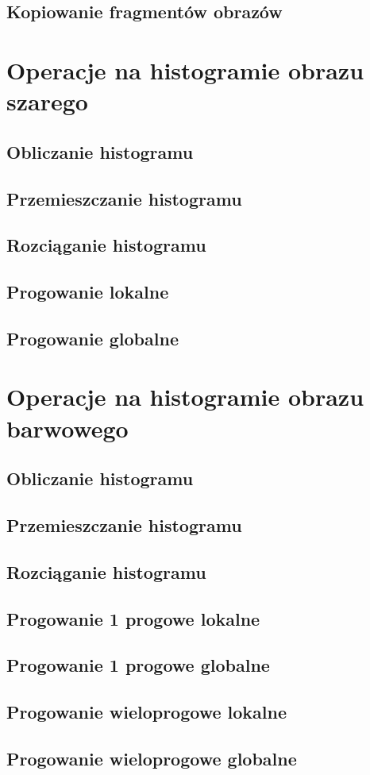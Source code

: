\documentclass[a4paper,12pt, titlepage]{report}
\begin{document}
\section{Kopiowanie fragmentów obrazów}

\chapter{Operacje na histogramie obrazu szarego}
\section{Obliczanie histogramu}
\section{Przemieszczanie histogramu}
\section{Rozciąganie histogramu}
\section{Progowanie lokalne}
\section{Progowanie globalne}

\chapter{Operacje na histogramie obrazu barwowego}
\section{Obliczanie histogramu}
\section{Przemieszczanie histogramu}
\section{Rozciąganie histogramu}
\section{Progowanie 1 progowe lokalne}
\section{Progowanie 1 progowe globalne}
\section{Progowanie wieloprogowe lokalne}
\section{Progowanie wieloprogowe globalne}
\end{document}
